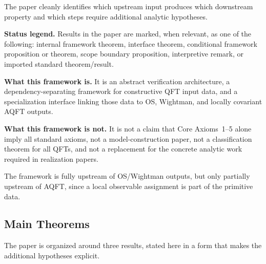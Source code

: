 \documentclass[12pt,a4paper]{article}
\theoremstyle{plain}
\theoremstyle{definition}
\theoremstyle{remark}
\begin{document}
The paper cleanly identifies which upstream input produces which
downstream property and which steps require additional analytic
hypotheses.

\medskip

\noindent\textbf{Status legend.}
Results in the paper are marked, when relevant, as one of the
following: internal framework theorem, interface theorem, conditional
framework proposition or theorem, scope boundary proposition,
interpretive remark, or imported standard theorem/result.

\medskip

\noindent\textbf{What this framework is.}
It is an abstract verification architecture, a dependency-separating
framework for constructive QFT input data, and a specialization
interface linking those data to OS, Wightman, and locally covariant
AQFT outputs.

\noindent\textbf{What this framework is not.}
It is not a claim that Core Axioms~1--5 alone imply all standard
axioms, not a model-construction paper, not a classification theorem
for all QFTs, and not a replacement for the concrete analytic work
required in realization papers.

The framework is fully upstream of OS/Wightman outputs, but only
partially upstream of AQFT, since a local observable assignment is
part of the primitive data.

\subsection{Main Theorems}

The paper is organized around three results, stated here in a form
that makes the additional hypotheses explicit.
\end{document}
